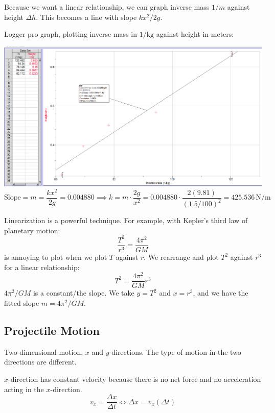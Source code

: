 \documentclass{article}
\newcommand{\remark}[2]{\begin{tcolorbox}[title={#1},colback=black!5!white,colframe=black!75!black,parbox=false] #2 \end{tcolorbox}}
\begin{document}
Because we want a linear relationship, we can graph inverse mass $1/m$ against height $\Delta h$. This becomes a line with slope $kx^2/2g$.

Logger pro graph, plotting inverse mass in $1/\text{kg}$ against height in meters:

\includegraphics[width=\linewidth]{loggerpro0903.png}
\begin{equation*}
	\text{Slope}
	=m 
	=\frac{kx^2}{2g}
	=0.004880
	\implies k=m\cdot \frac{2g}{x^2}
	=0.004880\cdot \frac{2(9.81)}{(1.5/100)^2}
	=\boxed{425.536\,\si{\newton\per\meter}}
\end{equation*}

\remark{Linearization}{Linearization is a powerful technique. For example, with Kepler's third law of planetary motion:
\begin{equation*}
    \frac{T^2}{r^3}=\frac{4\pi^2}{GM}
\end{equation*}
is annoying to plot when we plot $T$ against $r$. We rearrange and plot $T^2$ against $r^3$ for a linear relationship:
\begin{equation*}
    T^2=\frac{4\pi^2}{GM}r^3
\end{equation*}
$4\pi^2/GM$ is a constant/the slope. We take $y=T^2$ and $x=r^3$, and we have the fitted slope $m=4\pi^2/GM$.}

\subsection{Projectile Motion}

Two-dimensional motion, $x$ and $y$-directions. The type of motion in the two directions are different.

$x$-direction has constant velocity because there is no net force and no acceleration acting in the $x$-direction.
\begin{equation*}
    v_x=\frac{\Delta x}{\Delta t}
	\iff \Delta x=v_x(\Delta t)
\end{equation*}
\end{document}
